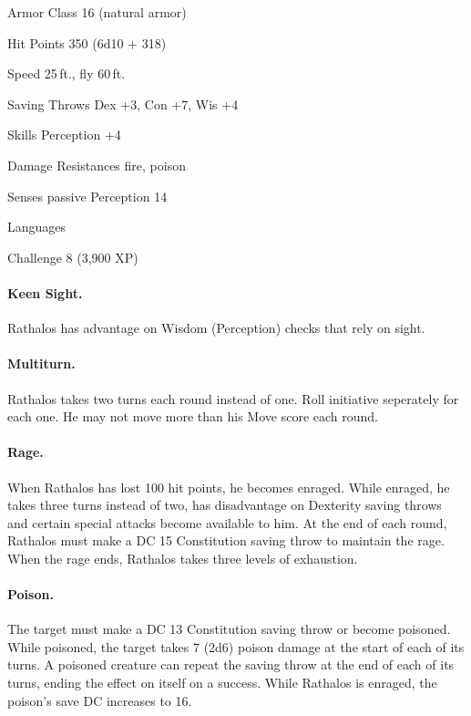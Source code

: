 \begin{hbMonsterNoteWide}[b]
\begin{multicols}{2}
\begin{hbStatBlock}
\begin{hbStatBlockDescription}
\item[Armor Class] 16 (natural armor)
\item[Hit Points] 350 (6d10 + 318)
\item[Speed] 25\,ft., fly 60\,ft.
\end{hbStatBlockDescription}
\SBSep
{}
\SBSep
\begin{hbStatBlockDescription}
\item[Saving Throws] Dex +3, Con +7, Wis +4
\item[Skills] Perception +4
\item[Damage Resistances] fire, poison
\item[Senses] passive Perception 14
\item[Languages] \hbNone
\item[Challenge] 8 (3,900 XP)
\end{hbStatBlockDescription}
\SBSep

\paragraph*{Keen Sight.} Rathalos has advantage on Wisdom (Perception) checks that rely on sight.

\paragraph*{Multiturn.} Rathalos takes two turns each round instead of one. Roll initiative seperately for each one. He may not move more than his Move score each round.

\paragraph*{Rage.} When Rathalos has lost 100 hit points, he becomes enraged. While enraged, he takes three turns instead of two, has disadvantage on Dexterity saving throws and certain special attacks become available to him. At the end of each round, Rathalos must make a DC 15 Constitution saving throw to maintain the rage. When the rage ends, Rathalos takes three levels of exhaustion.

\paragraph*{Poison.} The target must make a DC 13 Constitution saving throw or become poisoned. While poisoned, the target takes 7 (2d6) poison damage at the start of each of its turns. A poisoned creature can repeat the saving throw at the end of each of its turns, ending the effect on itself on a success. While Rathalos is enraged, the poison's save DC increases to 16.


\end{hbStatBlock}
\end{multicols}
\end{hbMonsterNoteWide}
